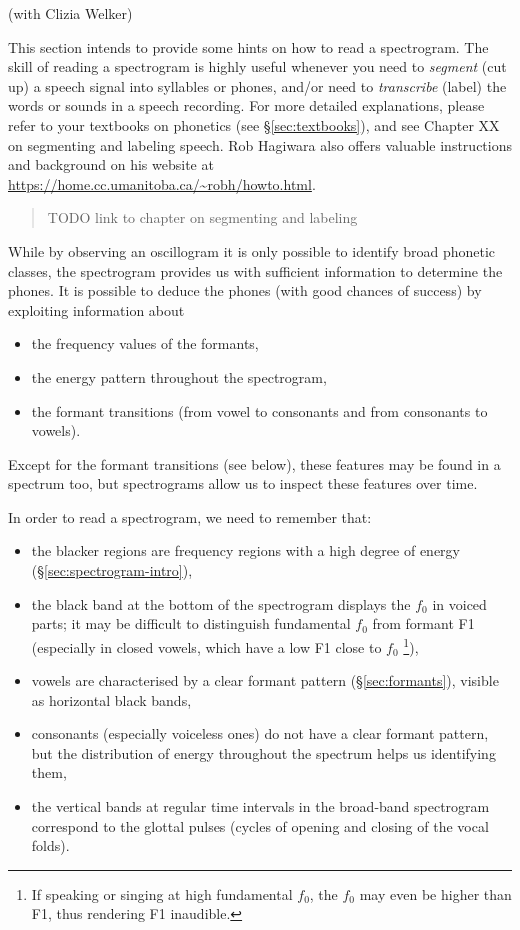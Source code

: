 \documentclass[
]{book}
\begin{document}
(with Clizia Welker)

\label{box-spectrogram}
This section intends to provide some hints on how to read a spectrogram. The skill of reading a spectrogram is highly useful whenever you need to \emph{segment} (cut up) a speech signal into syllables or phones, and/or need to \emph{transcribe} (label) the words or sounds in a speech recording. For more detailed explanations, please refer to your textbooks on phonetics (see §\ref{sec:textbooks}), and see Chapter XX on segmenting and labeling speech. Rob Hagiwara also offers valuable instructions and background on his website at
\url{https://home.cc.umanitoba.ca/~robh/howto.html}.

\begin{quote}
TODO link to chapter on segmenting and labeling
\end{quote}

While by observing an oscillogram it is only possible to identify broad phonetic classes, the spectrogram provides us with sufficient information to determine the phones. It is possible to deduce the phones (with good chances of success) by exploiting information about

\begin{itemize}
\item
  the frequency values of the formants,
\item
  the energy pattern throughout the spectrogram,
\item
  the formant transitions (from vowel to consonants and from consonants to vowels).
\end{itemize}

Except for the formant transitions (see below), these features may be found in a spectrum too, but spectrograms allow us to inspect these features over time.

In order to read a spectrogram, we need to remember that:

\begin{itemize}
\item
  the blacker regions are frequency regions with a high degree of energy (§\ref{sec:spectrogram-intro}),
\item
  the black band at the bottom of the spectrogram displays the \(f_0\) in voiced parts; it may be difficult to distinguish fundamental \(f_0\) from formant F1 (especially in closed vowels, which have a low F1 close to \(f_0\) \footnote{If speaking or singing at high fundamental \(f_0\), the \(f_0\) may even be higher than F1, thus rendering F1 inaudible.}),
\item
  vowels are characterised by a clear formant pattern (§\ref{sec:formants}), visible as horizontal black bands,
\item
  consonants (especially voiceless ones) do not have a clear formant pattern, but the distribution of energy throughout the spectrum helps us identifying them,
\item
  the vertical bands at regular time intervals in the broad-band spectrogram correspond to the glottal pulses (cycles of opening and closing of the vocal folds).
\end{itemize}
\end{document}
